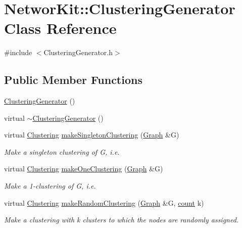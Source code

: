 \hypertarget{class_networ_kit_1_1_clustering_generator}{\section{Networ\-Kit\-:\-:Clustering\-Generator Class Reference}
\label{class_networ_kit_1_1_clustering_generator}
}


{\ttfamily \#include $<$Clustering\-Generator.\-h$>$}

\subsection*{Public Member Functions}
\begin{DoxyCompactItemize}
\item 
\hyperlink{class_networ_kit_1_1_clustering_generator_a9f953e4296caa047ca8810b1938264b8}{Clustering\-Generator} ()
\item 
virtual \hyperlink{class_networ_kit_1_1_clustering_generator_ad63aa03c038650c38d6a1bf767c734ff}{$\sim$\-Clustering\-Generator} ()
\item 
virtual \hyperlink{class_networ_kit_1_1_clustering}{Clustering} \hyperlink{class_networ_kit_1_1_clustering_generator_a0a9dc09f93d77c77562792b3537cf6c1}{make\-Singleton\-Clustering} (\hyperlink{class_networ_kit_1_1_graph}{Graph} \&G)
\begin{DoxyCompactList}\small\item\em Make a singleton clustering of G, i.\-e. \end{DoxyCompactList}\item 
virtual \hyperlink{class_networ_kit_1_1_clustering}{Clustering} \hyperlink{class_networ_kit_1_1_clustering_generator_ab1fb839d72c6ca2fcf0b7c2896fcd6e3}{make\-One\-Clustering} (\hyperlink{class_networ_kit_1_1_graph}{Graph} \&G)
\begin{DoxyCompactList}\small\item\em Make a 1-\/clustering of G, i.\-e. \end{DoxyCompactList}\item 
virtual \hyperlink{class_networ_kit_1_1_clustering}{Clustering} \hyperlink{class_networ_kit_1_1_clustering_generator_a07dd355941235150411b8cd17cff1da5}{make\-Random\-Clustering} (\hyperlink{class_networ_kit_1_1_graph}{Graph} \&G, \hyperlink{namespace_networ_kit_a76b399edfa50ae72e4aa86007aaa800a}{count} k)
\begin{DoxyCompactList}\small\item\em Make a clustering with k clusters to which the nodes are randomly assigned. \end{DoxyCompactList}\item 

\end{DoxyCompactItemize}
